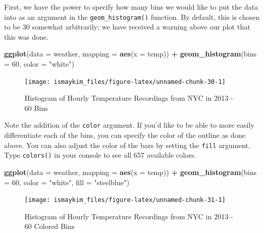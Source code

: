 \documentclass[12pt,]{krantz}
\makeatletter
\newenvironment{Shaded}{\begin{snugshade}}{\end{snugshade}}
\newcommand{\KeywordTok}[1]{\textcolor[rgb]{0.27,0.27,0.27}{\textbf{#1}}}
\newcommand{\DataTypeTok}[1]{\textcolor[rgb]{0.27,0.27,0.27}{#1}}
\newcommand{\DecValTok}[1]{\textcolor[rgb]{0.06,0.06,0.06}{#1}}
\newcommand{\StringTok}[1]{\textcolor[rgb]{0.5,0.5,0.5}{#1}}
\newcommand{\OperatorTok}[1]{\textcolor[rgb]{0.43,0.43,0.43}{\textbf{#1}}}
\newcommand{\NormalTok}[1]{#1}
\newenvironment{kframe}{%
\medskip{}
\setlength{\fboxsep}{.8em}
 \def\at@end@of@kframe{}%
 \ifinner\ifhmode%
  \def\at@end@of@kframe{\end{minipage}}%
  \begin{minipage}{\columnwidth}%
 \fi\fi%
 \def\FrameCommand##1{\hskip\@totalleftmargin \hskip-\fboxsep
 \colorbox{shadecolor}{##1}\hskip-\fboxsep
     \hskip-\linewidth \hskip-\@totalleftmargin \hskip\columnwidth}%
 \MakeFramed {\advance\hsize-\width
   \@totalleftmargin\z@ \linewidth\hsize
   \@setminipage}}%
 {\par\unskip\endMakeFramed%
 \at@end@of@kframe}
\renewenvironment{Shaded}{\begin{kframe}}{\end{kframe}}
\theoremstyle{definition}
\theoremstyle{definition}
\theoremstyle{definition}
\theoremstyle{remark}
\makeatother
\begin{document}
First, we have the power to specify how many bins we would like to put
the data into as an argument in the \texttt{geom\_histogram()} function.
By default, this is chosen to be 30 somewhat arbitrarily; we have
received a warning above our plot that this was done.

\begin{Shaded}
\begin{Highlighting}[]
\KeywordTok{ggplot}\NormalTok{(}\DataTypeTok{data =}\NormalTok{ weather, }\DataTypeTok{mapping =} \KeywordTok{aes}\NormalTok{(}\DataTypeTok{x =}\NormalTok{ temp)) }\OperatorTok{+}
\StringTok{  }\KeywordTok{geom_histogram}\NormalTok{(}\DataTypeTok{bins =} \DecValTok{60}\NormalTok{, }\DataTypeTok{color =} \StringTok{"white"}\NormalTok{)}
\end{Highlighting}
\end{Shaded}

\begin{figure}

{\centering \texttt{[image: ismaykim\_files/figure-latex/unnamed-chunk-30-1]} 

}

\caption{Histogram of Hourly Temperature Recordings from NYC in 2013 - 60 Bins}\label{fig:unnamed-chunk-30}
\end{figure}

Note the addition of the \texttt{color} argument. If you'd like to be
able to more easily differentiate each of the bins, you can specify the
color of the outline as done above. You can also adjust the color of the
bars by setting the \texttt{fill} argument. Type \texttt{colors()} in
your console to see all 657 available colors.

\begin{Shaded}
\begin{Highlighting}[]
\KeywordTok{ggplot}\NormalTok{(}\DataTypeTok{data =}\NormalTok{ weather, }\DataTypeTok{mapping =} \KeywordTok{aes}\NormalTok{(}\DataTypeTok{x =}\NormalTok{ temp)) }\OperatorTok{+}
\StringTok{  }\KeywordTok{geom_histogram}\NormalTok{(}\DataTypeTok{bins =} \DecValTok{60}\NormalTok{, }\DataTypeTok{color =} \StringTok{"white"}\NormalTok{, }\DataTypeTok{fill =} \StringTok{"steelblue"}\NormalTok{)}
\end{Highlighting}
\end{Shaded}

\begin{figure}

{\centering \texttt{[image: ismaykim\_files/figure-latex/unnamed-chunk-31-1]} 

}

\caption{Histogram of Hourly Temperature Recordings from NYC in 2013 - 60 Colored Bins}\label{fig:unnamed-chunk-31}
\end{figure}
\end{document}

